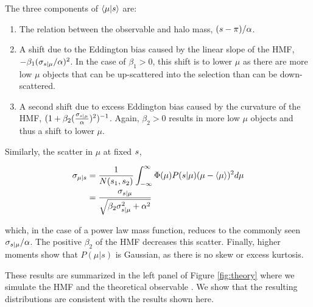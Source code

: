 \documentclass[a4paper,fleqn,usenatbib]{mnras}
\begin{document}
    \noindent The three components of $\langle \mu | s \rangle$ are: 
    
    \begin{enumerate}
    	
        \item The relation between the observable and halo mass, $(s- \pi) / \alpha$.
    
        \item A shift due to the Eddington bias caused by the linear slope of the HMF, $-\beta_1
            (\sigma_{s{} | \mu{}} / \alpha)^2$. In the case of $\beta_1 > 0$, this shift is to lower $\mu$ as
            there are more low $\mu$ objects that can be up-scattered into the selection than can be
            down-scattered.
    
        \item A second shift due to excess Eddington bias caused by the curvature of the HMF, $(1 +
            \beta_2 (\frac{\sigma_{s{} | \mu{}}}{\alpha})^2)^{-1}$. Again, $\beta_2 > 0$ results in more low
            $\mu$ objects and thus a shift to lower $\mu$.
    	
    \end{enumerate}
    
    Similarly, the scatter in $\mu$ at fixed $s$,

    \begin{equation}
    \begin{aligned}
        \sigma_{\mu{} | s{}}{} 
        &= \frac{1}{N(s_1, s_2)}
            \int_{-\infty}^{\infty} \Phi(\mu){} P(s{} | \mu) ( \mu  - \langle \mu \rangle )^2 d\mu \\
    	&= \frac{\sigma_{s{} | \mu{}}}{\sqrt{\beta_2 \sigma_{s{} | \mu{}}^2 + \alpha^2}}
        \label{eq:scatter_of_mu}
    \end{aligned}
    \end{equation}
    
    \noindent which, in the case of a power law mass function, reduces to the commonly seen
    $\sigma_{s{} | \mu{}} / \alpha$. The positive $\beta_2$ of the HMF decreases this scatter.
    Finally, higher moments show that $P(\mu | s)$ is Gaussian, as there is no skew or excess
    kurtosis.
    
    These results are summarized in the left panel of Figure \ref{fig:theory} where we simulate the
    HMF and the theoretical observable \obsSym{}. We show that the resulting distributions are
    consistent with the results shown here.
    
\end{document}
